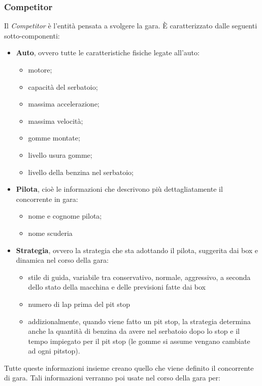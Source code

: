 \subsubsection{Competitor}
\label{competitor}
Il \emph{Competitor} \`{e} l'entit\`{a} pensata a svolgere la gara. \`{E} caratterizzato dalle seguenti sotto-componenti:
\begin{itemize}
\item \textbf{Auto}, ovvero tutte le caratteristiche fisiche legate all'auto:
	\begin{itemize}
		\item motore;
		\item capacit\`{a} del serbatoio;
		\item massima accelerazione;
		\item massima velocit\`{a};
		\item gomme montate;
		\item livello usura gomme;
		\item livello della benzina nel serbatoio;
	\end{itemize}
\item \textbf{Pilota}, cio\`{e} le informazioni che descrivono pi\`{u} dettagliatamente il concorrente in gara:
	\begin{itemize}
		\item nome e cognome pilota;
		\item nome scuderia
	\end{itemize}
\item \textbf{Strategia}, ovvero la strategia che sta adottando il pilota, suggerita dai box e dinamica nel corso della gara:
	\begin{itemize}
		\item stile di guida, variabile tra conservativo, normale, aggressivo, a seconda dello stato della macchina e delle
			previsioni fatte dai box
		\item numero di lap prima del pit stop
		\item addizionalmente, quando viene fatto un pit stop, la strategia determina anche
		 	la quantit\`{a} di benzina da avere nel serbatoio dopo lo stop e il tempo impiegato per il pit stop (le gomme si assume vengano
		 	cambiate ad ogni pitstop).
	\end{itemize}
\end{itemize}
Tutte queste informazioni insieme creano quello che viene definito il concorrente di gara. 
Tali informazioni verranno poi usate nel corso della gara per:
